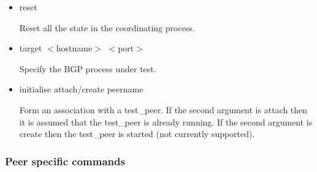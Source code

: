 \documentclass[11pt]{article}
\begin{document}
\begin{itemize}

  \item {\sf reset}

  Reset all the state in the coordinating process.

  \item {\sf target $<$hostname$>$ $<$port$>$}

  Specify the BGP process under test.

  \item {\sf initialise attach$/$create peername}

  Form an association with a test\_peer. If the second argument is attach then
  it is assumed that the test\_peer is already running. If the second
  argument is create then the test\_peer is started (not currently
  supported).

\end{itemize}

\subsubsection{Peer specific commands}
\end{document}
